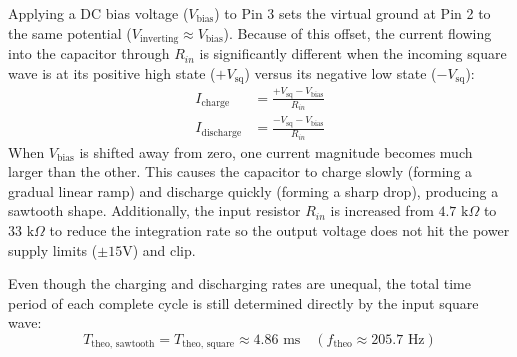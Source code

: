 \documentclass[11pt,a4paper]{article}
\begin{document}
Applying a DC bias voltage ($V_{\text{bias}}$) to Pin 3 sets the virtual ground at Pin 2 to the same potential ($V_{\text{inverting}} \approx V_{\text{bias}}$). Because of this offset, the current flowing into the capacitor through $R_{in}$ is significantly different when the incoming square wave is at its positive high state ($+V_{\text{sq}}$) versus its negative low state ($-V_{\text{sq}}$):
\begin{align*}
    I_{\text{charge}} &= \frac{+V_{\text{sq}} - V_{\text{bias}}}{R_{in}} \\
    I_{\text{discharge}} &= \frac{-V_{\text{sq}} - V_{\text{bias}}}{R_{in}}
\end{align*}
When $V_{\text{bias}}$ is shifted away from zero, one current magnitude becomes much larger than the other. This causes the capacitor to charge slowly (forming a gradual linear ramp) and discharge quickly (forming a sharp drop), producing a sawtooth shape. Additionally, the input resistor $R_{in}$ is increased from $4.7\text{ k}\Omega$ to $33\text{ k}\Omega$ to reduce the integration rate so the output voltage does not hit the power supply limits ($\pm 15\text{V}$) and clip.

Even though the charging and discharging rates are unequal, the total time period of each complete cycle is still determined directly by the input square wave:
\begin{equation}
    T_{\text{theo, sawtooth}} = T_{\text{theo, square}} \approx 4.86\text{ ms} \quad (f_{\text{theo}} \approx 205.7\text{ Hz})
\end{equation}

\end{document}
